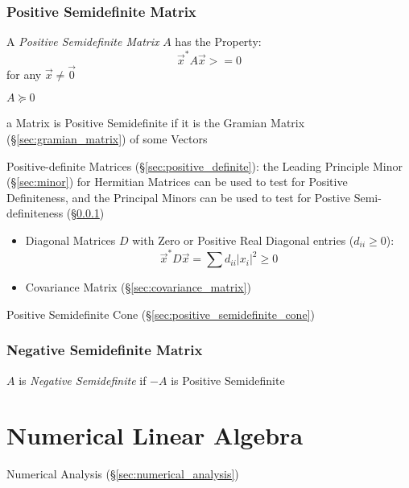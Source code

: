 \subsubsection{Positive Semidefinite Matrix}\label{sec:positive_semidefinite}

A \emph{Positive Semidefinite Matrix} $A$ has the Property:
\[
  \vec{x}^* A \vec{x} >= 0
\]
for any $\vec{x} \neq \vec{0}$

$A \succeq 0$

a Matrix is Positive Semidefinite if it is the Gramian Matrix
(\S\ref{sec:gramian_matrix}) of some Vectors

Positive-definite Matrices (\S\ref{sec:positive_definite}): the Leading
Principle Minor (\S\ref{sec:minor}) for Hermitian Matrices can be used to test
for Positive Definiteness, and the Principal Minors can be used to test for
Postive Semi-definiteness (\S\ref{sec:positive_semidefinite})

\begin{itemize}
  \item Diagonal Matrices $D$ with Zero or Positive Real Diagonal entries
    ($d_{ii} \geq 0$):
    \[
      \vec{x}^*D\vec{x} = \sum d_{ii}|x_i|^2 \geq 0
    \]
  \item Covariance Matrix (\S\ref{sec:covariance_matrix})
\end{itemize}

\fist Positive Semidefinite Cone (\S\ref{sec:positive_semidefinite_cone})



\subsubsection{Negative Semidefinite Matrix}\label{sec:negative_semidefinite}

$A$ is \emph{Negative Semidefinite} if $-A$ is Positive Semidefinite



\section{Numerical Linear Algebra}\label{sec:numerical_linear_algebra}

\fist Numerical Analysis (\S\ref{sec:numerical_analysis})



